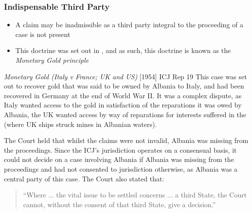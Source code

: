 \subsubsection{Indispensable Third Party}
\begin{itemize}
    \item A claim may be inadmissible as a third party integral to the proceeding of a case is not present
    \item This doctrine was set out in , and as such, this doctrine is known as the \textit{Monetary Gold principle}
\end{itemize}
\begin{casedetails}{\textit{Monetary Gold (Italy v France; UK and US)} [1954] ICJ Rep 19}
    \flushleft
    This case was set out to recover gold that was said to be owned by Albania to Italy, and had been recovered in Germany at the end of World War II. It was a complex dispute, as Italy wanted access to the gold in satisfaction of the reparations it was owed by Albania, the UK wanted access by way of reparations for interests suffered in the  (where UK ships struck mines in Albanian waters).

    \vspace{\baselineskip}

    The Court held that whilst the claims were not invalid, Albania was missing from the proceedings. Since the ICJ's jurisdiction operates on a consensual basis, it could not decide on a case involving Albania if Albania was missing from the proceedings and had not consented to jurisdiction otherwise, as Albania was a central party of this case. The Court also stated that:

    \begin{quote}
        ``Where ... the vital issue to be settled concerns ... a third State, the Court cannot, without the consent of that third State, give a decision.''
    \end{quote}
\end{casedetails}

